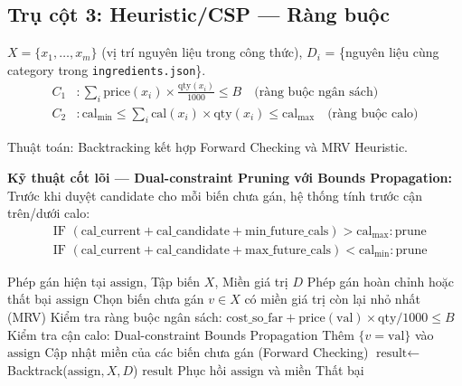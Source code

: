 \subsection{Trụ cột 3: Heuristic/CSP --- Ràng buộc}
\label{sec:csp}

$X = \{x_1, \ldots, x_m\}$ (vị trí nguyên liệu trong công thức), $D_i$ = \{nguyên liệu cùng category trong \texttt{ingredients.json}\}.
\begin{align}
C_1&: \sum_{i} \text{price}(x_i) \times \frac{\text{qty}(x_i)}{1000} \leq B \quad \text{(ràng buộc ngân sách)} \\
C_2&: \text{cal}_{\min} \leq \sum_{i} \text{cal}(x_i) \times \text{qty}(x_i) \leq \text{cal}_{\max} \quad \text{(ràng buộc calo)}
\end{align}

Thuật toán: Backtracking kết hợp Forward Checking và MRV Heuristic.

\textbf{Kỹ thuật cốt lõi --- Dual-constraint Pruning với Bounds Propagation:}
Trước khi duyệt candidate cho mỗi biến chưa gán, hệ thống tính trước cận trên/dưới calo:
\begin{align}
&\text{IF } (\text{cal\_current} + \text{cal\_candidate} + \text{min\_future\_cals}) > \text{cal}_{\max}: \text{prune} \\
&\text{IF } (\text{cal\_current} + \text{cal\_candidate} + \text{max\_future\_cals}) < \text{cal}_{\min}: \text{prune}
\end{align}

\begin{algorithm}[H]
\caption{CSP Backtracking với Forward Checking, MRV, và Dual-constraint Pruning}
\begin{algorithmic}[1]
\REQUIRE Phép gán hiện tại $\text{assign}$, Tập biến $X$, Miền giá trị $D$
\ENSURE Phép gán hoàn chỉnh hoặc thất bại
    \RETURN $\text{assign}$
\ENDIF
\STATE Chọn biến chưa gán $v \in X$ có miền giá trị còn lại nhỏ nhất (MRV)
    \STATE Kiểm tra ràng buộc ngân sách: $\text{cost\_so\_far} + \text{price}(\text{val}) \times \text{qty}/1000 \leq B$
    \STATE Kiểm tra cận calo: Dual-constraint Bounds Propagation
        \STATE Thêm $\{v = \text{val}\}$ vào $\text{assign}$
        \STATE Cập nhật miền của các biến chưa gán (Forward Checking)
        \STATE $\text{result} \leftarrow$ Backtrack($\text{assign}, X, D$)
            \RETURN $\text{result}$
        \ENDIF
        \STATE Phục hồi $\text{assign}$ và miền
    \ENDIF
\ENDFOR
\RETURN Thất bại
\end{algorithmic}
\end{algorithm}

